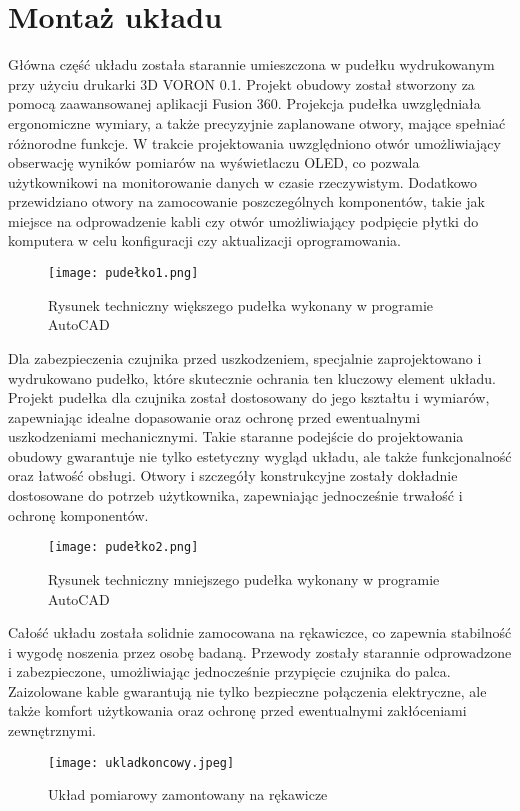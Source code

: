 \section{Montaż układu}
Główna część układu została starannie umieszczona w pudełku wydrukowanym przy użyciu drukarki 3D VORON 0.1. Projekt obudowy został stworzony za pomocą zaawansowanej aplikacji Fusion 360. Projekcja pudełka uwzględniała ergonomiczne wymiary, a także precyzyjnie zaplanowane otwory, mające spełniać różnorodne funkcje. W trakcie projektowania uwzględniono otwór umożliwiający obserwację wyników pomiarów na wyświetlaczu OLED, co pozwala użytkownikowi na monitorowanie danych w czasie rzeczywistym. Dodatkowo przewidziano otwory na zamocowanie poszczególnych komponentów, takie jak miejsce na odprowadzenie kabli czy otwór umożliwiający podpięcie płytki do komputera w celu konfiguracji czy aktualizacji oprogramowania. 
\begin{figure}[!htb]
  \centering
  \texttt{[image: pudełko1.png]}
  \caption{Rysunek techniczny większego pudełka wykonany w programie AutoCAD}
\end{figure}
Dla zabezpieczenia czujnika przed uszkodzeniem, specjalnie zaprojektowano i wydrukowano pudełko, które skutecznie ochrania ten kluczowy element układu. Projekt pudełka dla czujnika został dostosowany do jego kształtu i wymiarów, zapewniając idealne dopasowanie oraz ochronę przed ewentualnymi uszkodzeniami mechanicznymi. Takie staranne podejście do projektowania obudowy gwarantuje nie tylko estetyczny wygląd układu, ale także funkcjonalność oraz łatwość obsługi. Otwory i szczegóły konstrukcyjne zostały dokładnie dostosowane do potrzeb użytkownika, zapewniając jednocześnie trwałość i ochronę komponentów.
\begin{figure}[!htb]
  \centering
  \texttt{[image: pudełko2.png]}
  \caption{Rysunek techniczny mniejszego pudełka wykonany w programie AutoCAD}
\end{figure}
Całość układu została solidnie zamocowana na rękawiczce, co zapewnia stabilność i wygodę noszenia przez osobę badaną. Przewody zostały starannie odprowadzone i zabezpieczone, umożliwiając jednocześnie przypięcie czujnika do palca. Zaizolowane kable gwarantują nie tylko bezpieczne połączenia elektryczne, ale także komfort użytkowania oraz ochronę przed ewentualnymi zakłóceniami zewnętrznymi.
\begin{figure}[!htb]
  \centering
  \texttt{[image: ukladkoncowy.jpeg]}
  \caption{Układ pomiarowy zamontowany na rękawicze}
\end{figure}

